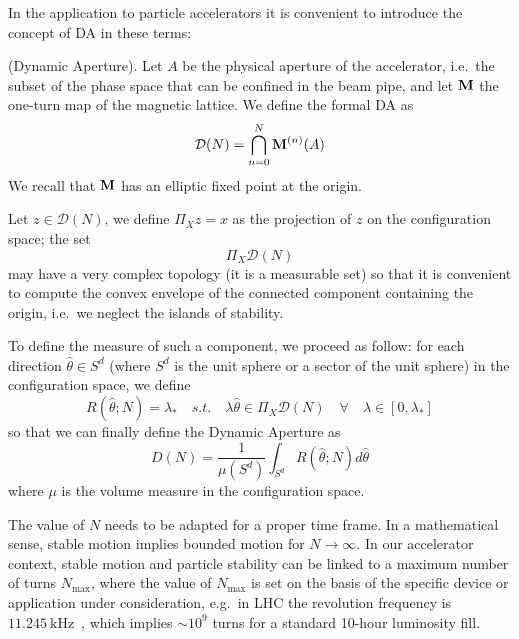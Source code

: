 In the application to particle accelerators it is convenient to introduce the concept of DA in these terms: 
\begin{definition}
	(Dynamic Aperture). Let \(A\) be the physical aperture of the accelerator, i.e.\ the subset of the phase space that can be confined in the beam pipe, and let \(\vb{M}\) the one-turn map of the magnetic lattice. We define the formal DA as
	\begin{equation}
		\mathcal{D}(N)=\bigcap_{n=0}^N \vb{M}^{(n)}(A)
	\end{equation}
	We recall that \(\vb{M}\) has an elliptic fixed point at the origin.\par\noindent 
	Let \(z\in \mathcal{D}(N)\), we define \(\Pi_X z=x\) as the projection of \(z\) on the configuration space; the set
	\begin{equation}
		\Pi_X\mathcal{D}(N)
	\end{equation}
	may have a very complex topology (it is a measurable set) so that it is convenient to compute the convex envelope of the connected component containing the origin, i.e.\ we neglect the islands of stability.\par\noindent 
	To define the measure of such a component, we proceed as follow: for each direction \(\hat \theta\in S^d\)  (where \(S^d\) is the unit sphere or a sector of the unit sphere) in the configuration space, we define
	\begin{equation}
	R(\hat \theta; N)=\lambda_\ast\quad s.t.\quad \lambda \hat\theta\in \Pi_X \mathcal{D}(N)\quad \forall \quad \lambda\in[0,\lambda_\ast]
	\label{eq:ideal-R}
	\end{equation}
	so that we can finally define the Dynamic Aperture as
	\begin{equation}
	D(N)=\frac{1}{\mu(S^d)}\int_{S^d} R(\hat \theta; N)d\hat\theta
	\label{eq:formal_da}
	\end{equation}
	where \(\mu\) is the volume measure in the configuration space.
	\label{def:dynamic_aperture}
\end{definition}

The value of \(N\) needs to be adapted for a proper time frame. In a mathematical sense, stable motion implies bounded motion for \(N\rightarrow\infty\). In our accelerator context, stable motion and particle stability can be linked to a maximum number of turns \(N_{\text{max}}\), where the value of \(N_{\text{max}}\) is set on the basis of the specific device or application under consideration, e.g.\ in LHC the revolution frequency is \(\SI{11.245}{\kHz}\)~\cite{lhc:faqs}, which implies \(\sim 10^9\) turns for a standard 10-hour luminosity fill. 

